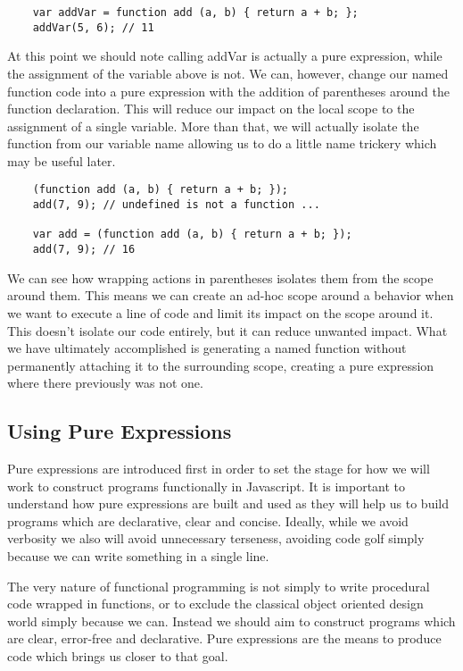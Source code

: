 \documentclass[a4paper,12pt,twoside]{book}
\begin{document}
\begin{lstlisting}
    var addVar = function add (a, b) { return a + b; };
    addVar(5, 6); // 11
\end{lstlisting}
 
 At this point we should note calling addVar is actually a pure expression, while the assignment of the variable above is not. We can, however, change our named function code into a pure expression with the addition of parentheses around the function declaration.  This will reduce our impact on the local scope to the assignment of a single variable.  More than that, we will actually isolate the function from our variable name allowing us to do a little name trickery which may be useful later.
 
\begin{lstlisting}
    (function add (a, b) { return a + b; });
    add(7, 9); // undefined is not a function ...
    
    var add = (function add (a, b) { return a + b; });
    add(7, 9); // 16
\end{lstlisting} 
 
 We can see how wrapping actions in parentheses isolates them from the scope around them. This means we can create an ad-hoc scope around a behavior when we want to execute a line of code and limit its impact on the scope around it. This doesn't isolate our code entirely, but it can reduce unwanted impact. What we have ultimately accomplished is generating a named function without permanently attaching it to the surrounding scope, creating a pure expression where there previously was not one.
 
\subsection{Using Pure Expressions}
 
 Pure expressions are introduced first in order to set the stage for how we will work to construct programs functionally in Javascript.  It is important to understand how pure expressions are built and used as they will help us to build programs which are declarative, clear and concise.  Ideally, while we avoid verbosity we also will avoid unnecessary terseness, avoiding code golf simply because we can write something in a single line.
 
 The very nature of functional programming is not simply to write procedural code wrapped in functions, or to exclude the classical object oriented design world simply because we can. Instead we should aim to construct programs which are clear, error-free and declarative. Pure expressions are the means to produce code which brings us closer to that goal.
 
\end{document}
